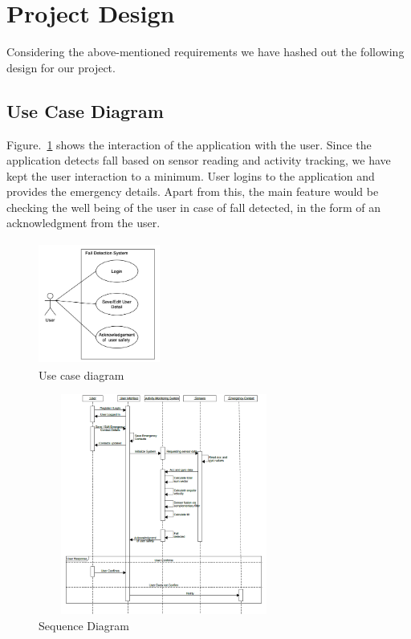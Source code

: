 \documentclass[conference]{IEEEtran}
\begin{document}
\section{Project Design}
Considering the above-mentioned requirements we have hashed out the following design for our project.

\subsection{Use Case Diagram}
Figure.~\ref{usecase} shows the interaction of the application with the user. Since the application detects fall based on sensor reading and activity tracking, we have kept the user interaction to a minimum. User logins to the application and provides the emergency details. Apart from this, the main feature would be checking the well being of the user in case of fall detected, in the form of an acknowledgment from the user.

\begin{figure}
\centerline{\includegraphics[width=4cm, height=4cm]{usecase.png}}
\caption{Use case diagram}
\label{usecase}
\end{figure}

\begin{figure}
\centerline{\includegraphics[width=8.25cm, height=7.25cm]{sequenceDiagram.PNG}}
\caption{Sequence Diagram}
\label{sequenceDiagram}
\end{figure} 
\end{document}
